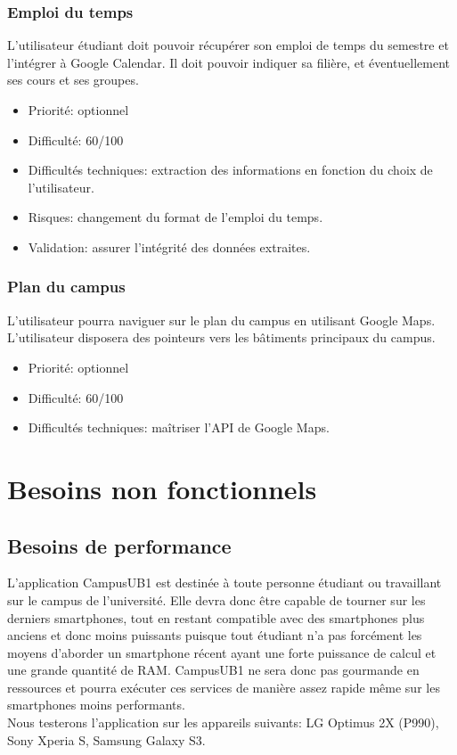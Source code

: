 \documentclass [pdftex,12pt] {report}
\begin{document}
\subsubsection{Emploi du temps}
L'utilisateur étudiant doit pouvoir récupérer son emploi de temps du semestre et l'intégrer à Google Calendar. Il doit pouvoir indiquer sa filière, et éventuellement ses cours et ses groupes. \\

\begin{itemize}
\renewcommand{\labelitemi}{$\bullet$}
\item Priorité: optionnel
\item Difficulté: 60/100
\item Difficultés techniques: extraction des informations en fonction du choix de l'utilisateur.
\item Risques: changement du format de l'emploi du temps.
\item Validation: assurer l'intégrité des données extraites.
\end{itemize}

\subsubsection{Plan du campus}
L'utilisateur pourra naviguer sur le plan du campus en utilisant Google Maps. L'utilisateur disposera des pointeurs vers les bâtiments principaux du campus. \\

\begin{itemize}
\renewcommand{\labelitemi}{$\bullet$}
\item Priorité: optionnel
\item Difficulté: 60/100
\item Difficultés techniques: maîtriser l'API de Google Maps.
\end{itemize}



\section{Besoins non fonctionnels}
\subsection{Besoins de performance}
L'application CampusUB1 est destinée à toute personne étudiant ou travaillant sur le campus de l'université. Elle devra donc être capable de tourner sur les derniers smartphones, tout en restant compatible avec des smartphones plus anciens et donc moins puissants puisque tout étudiant n'a pas forcément les moyens d'aborder un smartphone récent ayant une forte puissance de calcul et une grande quantité de RAM. CampusUB1 ne sera donc pas gourmande en ressources et pourra exécuter ces services de manière assez rapide même sur les smartphones moins performants.\\
Nous testerons l'application sur les appareils suivants: LG Optimus 2X (P990), Sony Xperia S, Samsung Galaxy S3.\\
\end{document}
